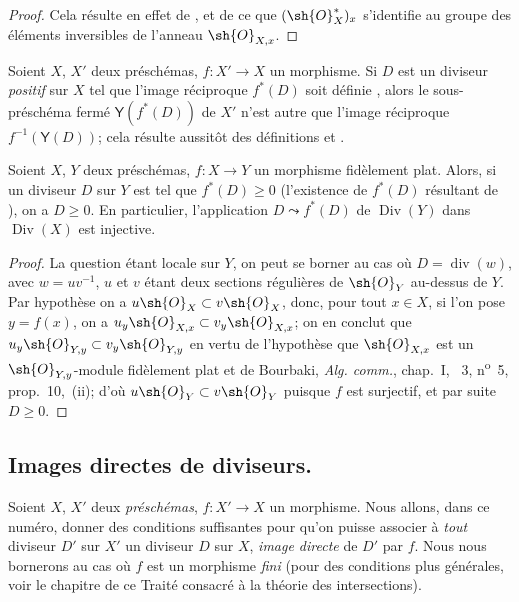 \begin{proof}
Cela résulte en effet de ,  et de ce que $(\sh{O}_X^*)_x$ s'identifie au groupe des éléments inversibles de l'anneau $\sh{O}_{X,x}$.
\end{proof}

\begin{env}[21.4.7]
\label{IV.21.4.7}
Soient $X$, $X'$ deux préschémas, $f:X'\to X$ un morphisme.
Si $D$ est un diviseur \emph{positif} sur $X$ tel que l'image réciproque $f^*(D)$ soit définie , alors le sous-préschéma fermé $\boldsymbol{\mathsf{Y}}(f^*(D))$ de $X'$ n'est autre que l'image réciproque $f^{-1}(\boldsymbol{\mathsf{Y}}(D))$;
cela résulte aussitôt des définitions  et .
\end{env}

\begin{proposition}[21.4.8]
Soient $X$, $Y$ deux préschémas,
$f:X\to Y$ un morphisme fidèlement plat.
Alors, si un diviseur $D$ sur $Y$ est tel que $f^*(D)\geq0$ \textup{(l'existence de $f^*(D)$ résultant de )}, on a $D\geq0$.
En particulier, l'application $D\leadsto f^*(D)$ de $\operatorname{Div}(Y)$ dans $\operatorname{Div}(X)$ est injective.
\end{proposition}

\begin{proof}
La question étant locale sur $Y$, on peut se borner au cas où $D=\operatorname{div}(w)$, avec $w=uv^{-1}$, $u$ et $v$ étant deux sections régulières de $\sh{O}_Y$ au-dessus de $Y$.
Par hypothèse on a $u\sh{O}_X\subset v\sh{O}_X$, donc, pour tout $x\in X$, si l'on pose $y=f(x)$, on a $u_y\sh{O}_{X,x}\subset v_y\sh{O}_{X,x}$;
on en conclut que $u_y\sh{O}_{Y,y}\subset v_y\sh{O}_{Y,y}$ en vertu de l'hypothèse que $\sh{O}_{X,x}$ est un $\sh{O}_{Y,y}$-module fidèlement plat et de Bourbaki, \emph{Alg. comm.}, chap.~I, \textsection~3, n\textsuperscript{o}~5, prop.~10,~(ii);
d'où $u\sh{O}_Y\subset v\sh{O}_Y$ puisque $f$ est surjectif, et par suite $D\geq0$.
\end{proof}

\subsection{Images directes de diviseurs.}
\label{IV.21.5}

\begin{env}[21.5.1]
\label{IV.21.5.1}
Soient $X$, $X'$ deux \emph{préschémas}, $f:X'\to X$ un morphisme.
Nous allons, dans ce numéro, donner des conditions suffisantes pour qu'on puisse associer à \emph{tout} diviseur $D'$ sur $X'$ un diviseur $D$ sur $X$, \emph{image directe} de $D'$ par $f$.
Nous nous bornerons au cas où $f$ est un morphisme \emph{fini} (pour des conditions plus générales, voir le chapitre de ce Traité consacré à la théorie des intersections).
\end{env}

